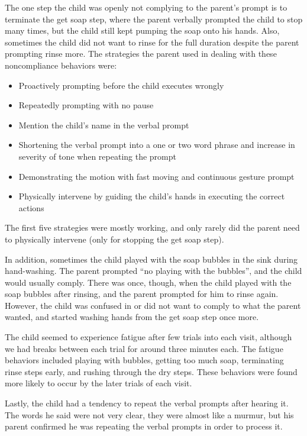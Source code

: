 The one step the child was openly not complying to the parent's prompt is to terminate the get soap step, where the parent verbally prompted the child to stop many times, but the child still kept pumping the soap onto his hands.  Also, sometimes the child did not want to rinse for the full duration despite the parent prompting rinse more.  The strategies the parent used in dealing with these noncompliance behaviors were:
\begin{itemize}
	\item Proactively prompting before the child executes wrongly
	\item Repeatedly prompting with no pause
	\item Mention the child's name in the verbal prompt
	\item Shortening the verbal prompt into a one or two word phrase and increase in severity of tone when repeating the prompt
	\item Demonstrating the motion with fast moving and continuous gesture prompt
	\item Physically intervene by guiding the child's hands in executing the correct actions
\end{itemize}
The first five strategies were mostly working, and only rarely did the parent need to physically intervene (only for stopping the get soap step).

In addition, sometimes the child played with the soap bubbles in the sink during hand-washing.  The parent prompted ``no playing with the bubbles'', and the child would usually comply.  There was once, though, when the child played with the soap bubbles after rinsing, and the parent prompted for him to rinse again.  However, the child was confused in or did not want to comply to what the parent wanted, and started washing hands from the get soap step once more.

The child seemed to experience fatigue after few trials into each visit, although we had breaks between each trial for around three minutes each.  The fatigue behaviors included playing with bubbles, getting too much soap, terminating rinse steps early, and rushing through the dry steps.  These behaviors were found more likely to occur by the later trials of each visit.

Lastly, the child had a tendency to repeat the verbal prompts after hearing it.  The words he said were not very clear, they were almost like a murmur, but his parent confirmed he was repeating the verbal prompts in order to process it.

